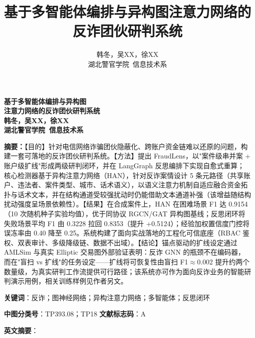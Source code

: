 \documentclass[12pt,a4paper]{ctexart}
\title{基于多智能体编排与异构图注意力网络的反诈团伙研判系统}
\author{韩冬，吴XX，徐XX\\湖北警官学院~信息技术系}
\date{}
\begin{document}
\vspace*{-1.6cm}
\begin{center}
  \bfseries\Large 基于多智能体编排与异构图\\[2pt]
  注意力网络的反诈团伙研判系统\\[4pt]
  \mdseries\large 韩冬，吴XX，徐XX\\[2pt]
  \small 湖北警官学院~信息技术系
\end{center}
\vspace{4pt}

\noindent\textbf{摘要：}【目的】针对电信网络诈骗团伙隐蔽化、跨账户资金链难以还原的问题，构建一套可落地的反诈团伙研判系统。【方法】提出 FraudLens，以"案件级串并案 + 账户级扩线"形成两级研判闭环，并在 LangGraph 反思编排下实现自愈式重算；核心检测器基于异构注意力网络（HAN），针对反诈案情设计 5 条元路径（共享账户、违法者、案件类型、城市、话术语义），以语义注意力机制自适应融合资金拓扑与话术文本，并在结构通道受较强扰动时仍能借助文本通道补强（该增益随结构扰动强度呈场景依赖性）。【结果】在合成案件上，HAN 在困难场景 F1 达 0.9154（10 次随机种子实验均值），优于同协议 RGCN/GAT 异构图基线；反思闭环将失败场景平均 F1 由 0.3228 拉回 0.8353（提升 +0.5124）；经验加权置信度门控将误冻率由 0.40 降至 0.25。系统构建了面向实战落地的工程化可信底座（RBAC 鉴权、双表审计、多级降级链、数据不出域）。【结论】锚点驱动的扩线设定通过 AMLSim 与真实 Elliptic 交易图外部验证表明：反诈 GNN 的瓶颈不在编码器，而在"盲扫 vs 扩线"的任务设定——扩线将可恢复性由盲扫 F1$\approx$0.002 提升约两个数量级，为真实研判工作流提供可行路径；该系统亦可作为面向反诈业务的智能研判演示用例，相关训练样例见作者另文。

\vspace{2pt}

\noindent\textbf{关键词}：反诈；图神经网络；异构注意力网络；多智能体；反思闭环

\noindent\textbf{中图分类号}：TP393.08；TP18 \qquad \textbf{文献标志码}：A

\noindent\textbf{英文摘要}：
\end{document}
